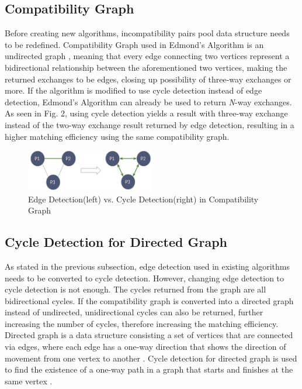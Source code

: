 \documentclass[conference]{IEEEtran}
\begin{document}
\subsection{Compatibility Graph}
Before creating new algorithms, incompatibility pairs pool data structure needs to be redefined. Compatibility Graph
used in Edmond's Algorithm is an undirected graph \cite{raja}, meaning that every edge connecting two vertices represent a bidirectional
relationship between the aforementioned two vertices, making the returned exchanges to be edges, closing up possibility
of three-way exchanges or more. If the algorithm is modified to use cycle detection instead of edge detection, Edmond's
Algorithm can already be used to return \textit{N}-way exchanges.
As seen in Fig. 2, using cycle detection yields a result with three-way exchange instead of the two-way exchange result
returned by edge detection, resulting in a higher matching efficiency using the same compatibility graph. 

\begin{figure}[h]
    \includegraphics[width=0.5\textwidth]{images/edge-vs-cycle-detection.jpg}
    \caption{Edge Detection(left) vs. Cycle Detection(right) in Compatibility Graph}
\end{figure}

\subsection{Cycle Detection for Directed Graph}
As stated in the previous subsection, edge detection used in existing algorithms needs to be converted to cycle detection.
However, changing edge detection to cycle detection is not enough. The cycles returned from the graph are all bidirectional
cycles. If the compatibility graph is converted into a directed graph instead of undirected, unidirectional cycles can also be
returned, further increasing the number of cycles, therefore increasing the matching efficiency.
Directed graph is a data structure consisting a set of vertices that are connected via edges, where each edge has a one-way
direction that shows the direction of movement from one vertex to another \cite{sedgewick}.
Cycle detection for directed graph is used to find the existence of a one-way path in a graph that starts and finishes
at the same vertex \cite{mehta}.
\end{document}
